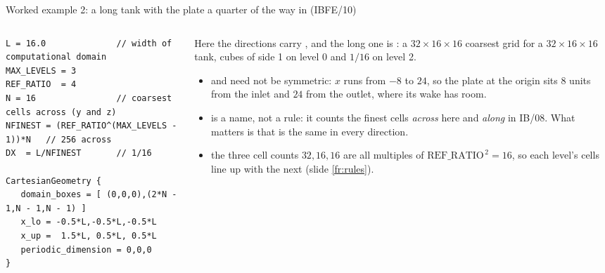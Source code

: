 \documentclass[aspectratio=169,11pt]{beamer}
\begin{document}
\begin{frame}[fragile]{Worked example 2: a long tank with the plate a quarter of the way in (IBFE/10)}
\label{fr:ex2}
\begin{columns}[T,onlytextwidth]
\begin{column}{0.52\textwidth}
\begin{lstlisting}[style=inputtiny]
L = 16.0              // width of computational domain
MAX_LEVELS = 3
REF_RATIO  = 4
N = 16                // coarsest cells across (y and z)
NFINEST = (REF_RATIO^(MAX_LEVELS - 1))*N   // 256 across
DX  = L/NFINEST       // 1/16

CartesianGeometry {
   domain_boxes = [ (0,0,0),(2*N - 1,N - 1,N - 1) ]
   x_lo = -0.5*L,-0.5*L,-0.5*L
   x_up =  1.5*L, 0.5*L, 0.5*L
   periodic_dimension = 0,0,0
}
\end{lstlisting}
\end{column}
\begin{column}{0.46\textwidth}
\footnotesize Here the  directions carry , and the long one is : a $32 \times 16 \times 16$ coarsest grid for a $32 \times 16 \times 16$ tank, cubes of side 1 on level 0 and $1/16$ on level 2.
\begin{itemize}
  \item {} and  need not be symmetric: $x$ runs from $-8$ to $24$, so the plate at the origin sits $8$ units from the inlet and $24$ from the outlet, where its wake has room.
  \item {} is a name, not a rule: it counts the finest cells \emph{across} here and \emph{along} in IB/08. What matters is that  is the same in every direction.
  \item the three cell counts $32, 16, 16$ are all multiples of $\mathrm{REF\_RATIO}^{\,2} = 16$, so each level's cells line up with the next (slide \ref{fr:rules}).
\end{itemize}
\end{column}
\end{columns}
\end{frame}
\end{document}
